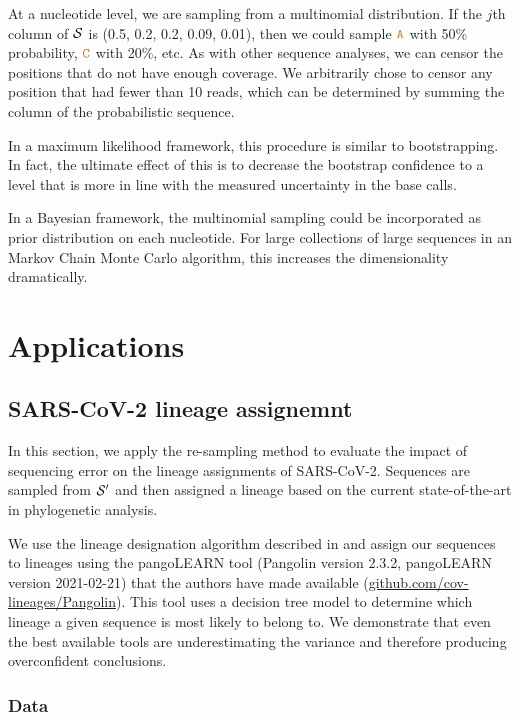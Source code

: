 \documentclass[10pt]{article}
\begin{document}
At a nucleotide level, we are sampling from a multinomial distribution.
If the $j$th column of $\mathcal{S}$ is (0.5, 0.2, 0.2, 0.09, 0.01), then we could sample $\texttt{\textcolor{brown}{A}}$ with 50\% probability, $\texttt{\textcolor{brown}{C}}$ with 20\%, etc.
As with other sequence analyses, we can censor the positions that do not have enough coverage.
We arbitrarily chose to censor any position that had fewer than 10 reads, which can be determined by summing the column of the probabilistic sequence.

In a maximum likelihood framework, this procedure is similar to bootstrapping.
In fact, the ultimate effect of this is to decrease the bootstrap confidence to a level that is more in line with the measured uncertainty in the base calls.

In a Bayesian framework, the multinomial sampling could be incorporated as prior distribution on each nucleotide.
For large collections of large sequences in an Markov Chain Monte Carlo algorithm, this increases the dimensionality dramatically.


\section{Applications}

\subsection{SARS-CoV-2 lineage assignemnt}

In this section, we apply the re-sampling method to evaluate the impact of sequencing error on the lineage assignments of SARS-CoV-2.
Sequences are sampled from $\mathcal{S}'$  and then assigned a lineage based on the current state-of-the-art in phylogenetic analysis.

We use the lineage designation algorithm described in \citet{rambautDynamicNomenclatureProposal2020} and assign our sequences to lineages using the pangoLEARN tool (Pangolin version 2.3.2, pangoLEARN version 2021-02-21) that the authors have made available (\url{github.com/cov-lineages/Pangolin}).
This tool uses a decision tree model to determine which lineage a given sequence is most likely to belong to.
We demonstrate that even the best available tools are underestimating the variance and therefore producing overconfident conclusions.

\subsubsection{Data}
\end{document}

